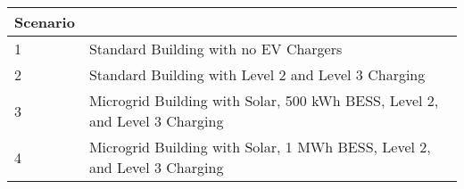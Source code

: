 \begin{tabularx}{\linewidth}{X | l}
\toprule
 Scenario &  \\
\midrule
		1  & Standard Building with no EV Chargers\\
        2 & Standard Building with Level 2 and Level 3 Charging\\
        3 & Microgrid Building with Solar, 500 kWh BESS, Level 2, and Level 3 Charging\\
        4 & Microgrid Building with Solar, 1 MWh BESS, Level 2, and Level 3 Charging\\
\bottomrule
\end{tabularx}
